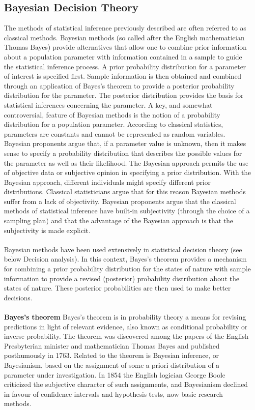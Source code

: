 \documentclass[main]{subfiles}
\begin{document}
\subsection{Bayesian Decision Theory}
The methods of statistical inference previously described are often referred to as classical methods. Bayesian methods (so called after the English mathematician Thomas Bayes) provide alternatives that allow one to combine prior information about a population parameter with information contained in a sample to guide the statistical inference process. A prior probability distribution for a parameter of interest is specified first. Sample information is then obtained and combined through an application of Bayes’s theorem to provide a posterior probability distribution for the parameter. The posterior distribution provides the basis for statistical inferences concerning the parameter. A key, and somewhat controversial, feature of Bayesian methods is the notion of a probability distribution for a population parameter. According to classical statistics, parameters are constants and cannot be represented as random variables. Bayesian proponents argue that, if a parameter value is unknown, then it makes sense to specify a probability distribution that describes the possible values for the parameter as well as their likelihood. The Bayesian approach permits the use of objective data or subjective opinion in specifying a prior distribution. With the Bayesian approach, different individuals might specify different prior distributions. Classical statisticians argue that for this reason Bayesian methods suffer from a lack of objectivity. Bayesian proponents argue that the classical methods of statistical inference have built-in subjectivity (through the choice of a sampling plan) and that the advantage of the Bayesian approach is that the subjectivity is made explicit.\\\\
Bayesian methods have been used extensively in statistical decision theory (see below Decision analysis). In this context, Bayes’s theorem provides a mechanism for combining a prior probability distribution for the states of nature with sample information to provide a revised (posterior) probability distribution about the states of nature. These posterior probabilities are then used to make better decisions.\\\\
\textbf{Bayes’s theorem}
Bayes’s theorem is in probability theory a means for revising predictions in light of relevant evidence, also known as conditional probability or inverse probability. The theorem was discovered among the papers of the English Presbyterian minister and mathematician Thomas Bayes and published posthumously in 1763. Related to the theorem is Bayesian inference, or Bayesianism, based on the assignment of some a priori distribution of a parameter under investigation. In 1854 the English logician George Boole criticized the subjective character of such assignments, and Bayesianism declined in favour of confidence intervals and hypothesis tests, now basic research methods.
\end{document}
